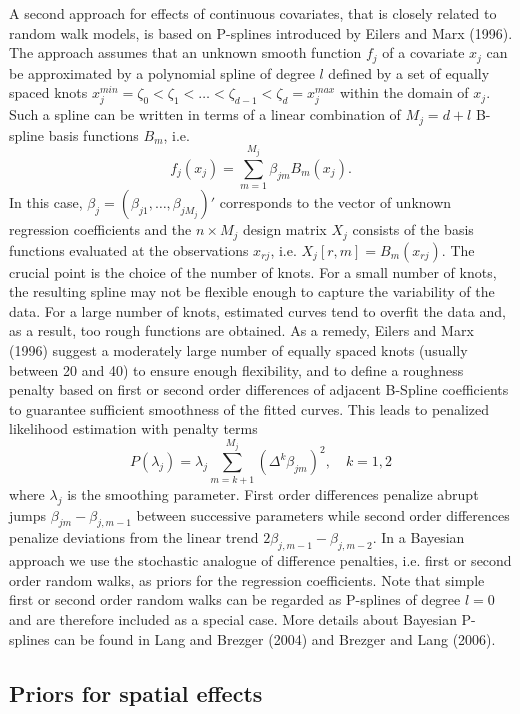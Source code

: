 \documentclass[11pt,a4paper,twoside]{bayesxarticle}
\begin{document}
A second approach for effects of continuous covariates, that is
closely related to random walk models, is based on P-splines
introduced by Eilers and Marx (1996). The approach assumes that an
unknown smooth function $f_j$ of a covariate $x_j$ can be
approximated by a polynomial spline of degree $l$ defined by a set
of equally spaced knots $x_j^{min} = \zeta_{0}  < \zeta_{1} < \dots
< \zeta_{d-1} < \zeta_{d} = x_j^{max}$ within the domain of $x_j$.
Such a spline can be written in terms of a linear combination of
$M_j = d+l$ B-spline basis functions $B_{m}$, i.e.
$$
f_j(x_j) = \sum_{m=1}^{M_j} \beta_{jm} B_{m}(x_j).
$$
In this case, $\beta_j = (\beta_{j1},\dots,\beta_{jM_j})'$
corresponds to the vector of unknown regression coefficients and the
$n \times M_j$ design matrix $X_j$ consists of the basis functions
evaluated at the observations $x_{rj}$, i.e. $X_j[r,m] =
B_m(x_{rj})$. The crucial point is the choice of the number of
knots. For a small number of knots, the resulting spline may not be
flexible enough to capture the variability of the data. For a large
number of knots, estimated curves tend to overfit the data and, as a
result, too rough functions are obtained. As a remedy, Eilers and
Marx (1996) suggest a moderately large number of equally spaced
knots (usually between 20 and 40) to ensure enough flexibility, and
to define a roughness penalty based on first or second order
differences of adjacent B-Spline coefficients to guarantee
sufficient smoothness of the fitted curves. This leads to penalized
likelihood estimation with penalty terms
\begin{equation}
\label{diffpenalty} P(\lambda_j) = \lambda_j \sum_{m=k+1}^{M_j}
(\Delta^k \beta_{jm})^2 , \quad k=1,2
\end{equation}
where $\lambda_j$ is the smoothing parameter. First order
differences penalize abrupt jumps $\beta_{jm}-\beta_{j,m-1}$ between
successive parameters while second order differences penalize
deviations from the linear trend $2 \beta_{j,m-1}-\beta_{j,m-2}$. In
a Bayesian approach we use the stochastic analogue of difference
penalties, i.e. first or second order random walks, as priors for
the regression coefficients. Note that simple first or second order
random walks can be regarded as P-splines of degree $l=0$ and are
therefore included as a special case. More details about Bayesian
P-splines can be found in Lang and Brezger (2004) and Brezger and
Lang (2006).


\subsection{Priors for spatial effects} \label{spatial}
\end{document}
